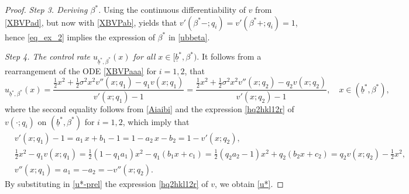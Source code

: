 \documentclass[10pt,a4paper]{amsart}
\def\ub{\underline{b}}
\begin{document}
\begin{proof}
\vspace{1mm}
{\it Step 3. Deriving $\beta^*$.}  
Using the continuous differentiability of $v$ from \eqref{XBVPad}, but now with \eqref{XBVPab}, yields that $v'(\beta^*-;q_i) = v'(\beta^*+;q_i) = 1$, hence \eqref{eq_ex_2} implies the expression of $\beta^*$ in \eqref{ubbeta}.


\vspace{1mm}
{\it Step 4. The control rate $u_{\ub^*,\beta^*}(x)$ for all $x \in [\ub^*,\beta^*)$}.
It follows from a rearrangement of the ODE \eqref{XBVPaaa} for $i=1,2$, that 
\begin{equation} \label{u*-prel}
u_{\ub^*,\beta^*}(x) 
= \frac{\tfrac12 x^2 + \tfrac12 \sigma^2 x^2 v''(x;q_1) - q_1 v(x;q_1)}{v'(x;q_1) - 1} 
= \frac{\tfrac12 x^2 + \tfrac12 \sigma^2 x^2 v''(x;q_2) - q_2 v(x;q_2)}{v'(x;q_2) - 1} 
, \quad x \in (\ub^*,\beta^*), 
\end{equation}
where the second equality follows from \eqref{Aiaibi} and the expression \eqref{hq2hkl12r} of $v(\cdot;q_i)$ on $(\ub^*,\beta^*)$ for $i=1,2$, which imply that 
\begin{align*}
&v'(x;q_1) - 1 
= a_1 \, x + b_1 - 1 
= 1 - a_2 \, x - b_2
= 1 - v'(x;q_2), \\
&\tfrac12 x^2 - q_1 v(x;q_1) 
= \tfrac12 (1 - q_1 a_1) x^2 - q_1 (b_1 x + c_1) 
= \tfrac12 (q_2 a_2 - 1) x^2 + q_2 (b_2 x + c_2) 
= q_2 v(x;q_2) - \tfrac12 x^2, \\
&v''(x;q_1) = a_1 = - a_2 = - v''(x;q_2).
\end{align*}
By substituting in \eqref{u*-prel} the expression \eqref{hq2hkl12r} of $v$, we obtain \eqref{u*}.


\end{proof}
\end{document}
